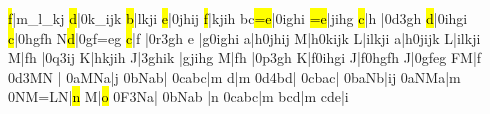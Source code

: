 \barre\notes{}\hl f|m{_l}{_k}j\enotes
\temps\notes{}\hl d|\qqh0k{_i}jk\enotes
\barre\notes{}\hl b|lkji\enotes
\temps\notes{}\hl e|\qqh0jhij\enotes
\barre\notes{}\hl f|kjih\enotes
\temps\notes\lh b\zh c\hl{=e}|\qqh0ighi\enotes
\barre\notes{}\hl{=e}|jihg\enotes
\temps\notes{}\hl c|\qu h\sk\enotes
\temps\notes|\Ilegl0d\dqh3gh\enotes
\barre\notes{}\hl d|\qqh0ihgi\enotes
\temps\notes{}\hl c|\qqh0hgfh\enotes
\barre\notes{}\lh N\hl d|\qqh0gf{=e}g\enotes
\temps\notes{}\hl c|\qu f\sk\enotes
\temps\notes{}|\Ilegu0r\dqh3gh\enotes
\barre\notes\bohl e\relax
     |\zq g\qqh0ighi\enotes
\temps\notes\bohl a|\zq h\qqh0jhij\enotes
\barre\notes\bohu M|\zq h\qqh0kijk\enotes
\temps\notes\bohu L|\zq ilkji\enotes
\barre\notes\bohu a|\zq h\qqh0jijk\enotes
\temps\notes\bohu L|\zq ilkji\enotes
\barre\Notes\bohu M|\zq f\qu h\enotes
\temps\notes|\Ilegu0q\dqh3ij\enotes
\temps\notes\bohu K|\zq hkjih\enotes
\barre\notes\bohu J|\qqh3ghik\enotes
\temps\notes{}|\zq gjihg\enotes
\barre\Notes\bohu M|\zq f\qu h\enotes
\temps\notes|\Ilegu0p\dqh3gh\enotes
\temps\notes\bohu K|\zq f\qqh0ihgi\enotes
\barre\notes\bohu J|\zq f\qqh0hgfh\enotes
\temps\notes\bohu J|\qqh0gfeg\enotes
\barre\Notes\zq F\ql M|\qu f\enotes
\notes{}\Ilegu0d\dqb3MN\relax
    |\soupir{}\enotes
\temps\notes\qqB0aMNa|\hu j\enotes
\barre\notes\qqB0bNab|\enotes
\temps\notes\qqB0cabc|\hu m\enotes
\barre\notes{}\ql d\sk|\hu m\enotes
\temps\notes\Ilegu0d\dqb4bd|\enotes
\temps\notes\qqB0cbac|\enotes
\barre\notes\qqB0baNb|\zh i\rh j\enotes
\temps\notes\qqB0aNMa|\hu m\enotes
\barre\notes\qqB0NM{=L}N|\hl n\enotes
\temps\notes{}\ql M\sk|\hl o\enotes
\temps\notes\Ilegl0F\dqb3Na|\enotes
\barre\notes{}\qqB0bNab\relax
     |\hu n\enotes
\temps\notes\qqB0cabc|\hu m\enotes
\barre\notes{}bcd|\hu m\enotes
\temps\notes{}cde|\rh i\enotes
